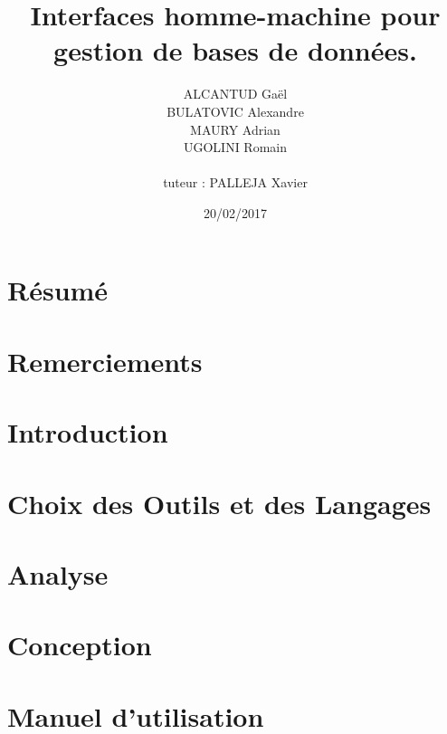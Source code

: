 \documentclass[12pt, a4paper, twoside, openright]{book}
\title{Interfaces homme-machine pour gestion de bases de données.}
\author{ALCANTUD Gaël \\ BULATOVIC Alexandre \\ MAURY Adrian \\ UGOLINI Romain \\ \\tuteur : PALLEJA Xavier}
\date{20/02/2017}
\begin{document}
\frontmatter
\maketitle

\thispagestyle{empty}
\chapter*{Résumé}


\thispagestyle{empty}
\chapter*{Remerciements}


\tableofcontents
\listoffigures
\printglossaries

\mainmatter
\chapter{Introduction}


\chapter{Choix des Outils et des Langages}


\chapter{Analyse}


\chapter{Conception}


\chapter{Manuel d'utilisation}


\backmatter
\end{document}
